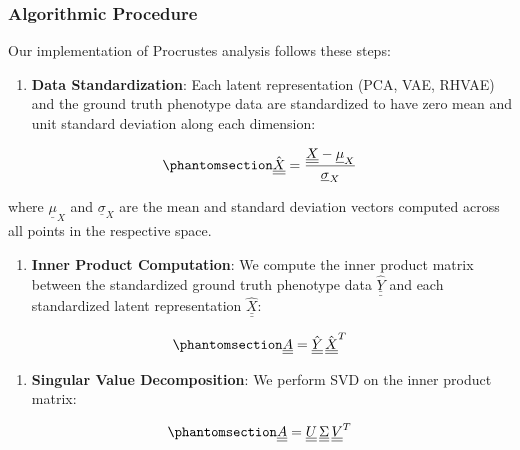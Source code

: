 \documentclass[
]{scrartcl}
\providecommand{\tightlist}{%
  \setlength{\itemsep}{0pt}\setlength{\parskip}{0pt}}
\begin{document}
\begin{refsection}
\subsubsection{Algorithmic Procedure}\label{algorithmic-procedure}

Our implementation of Procrustes analysis follows these steps:

\begin{enumerate}
\def\labelenumi{\arabic{enumi}.}
\tightlist
\item
  \textbf{Data Standardization}: Each latent representation (PCA, VAE,
  RHVAE) and the ground truth phenotype data are standardized to have
  zero mean and unit standard deviation along each dimension:
\end{enumerate}

\begin{equation}\phantomsection\label{eq-standardization}{
\hat{\underline{\underline{X}}} = 
\frac{
    \underline{\underline{X}} -
    \underline{\mu}_X
}{
    \underline{\sigma}_X
}
}\end{equation}

where \(\underline{\mu}_X\) and \(\underline{\sigma}_X\) are the mean
and standard deviation vectors computed across all points in the
respective space.

\begin{enumerate}
\def\labelenumi{\arabic{enumi}.}
\setcounter{enumi}{1}
\tightlist
\item
  \textbf{Inner Product Computation}: We compute the inner product
  matrix between the standardized ground truth phenotype data
  \(\hat{\underline{\underline{Y}}}\) and each standardized latent
  representation \(\hat{\underline{\underline{X}}}\):
\end{enumerate}

\begin{equation}\phantomsection\label{eq-inner-product}{
\underline{\underline{A}} = 
\hat{\underline{\underline{Y}}}\,
\hat{\underline{\underline{X}}}^T
}\end{equation}

\begin{enumerate}
\def\labelenumi{\arabic{enumi}.}
\setcounter{enumi}{2}
\tightlist
\item
  \textbf{Singular Value Decomposition}: We perform SVD on the inner
  product matrix:
\end{enumerate}

\begin{equation}\phantomsection\label{eq-svd}{
\underline{\underline{A}} = 
\underline{\underline{U}}\,
\underline{\underline{\Sigma}}\,
\underline{\underline{V}}^T
}\end{equation}


\end{refsection}
\end{document}
